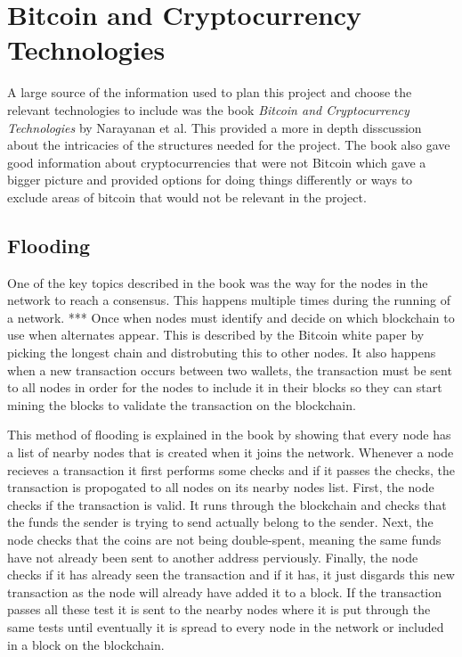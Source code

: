 \documentclass{l4proj}
\begin{document}
\section{Bitcoin and Cryptocurrency Technologies}
A large source of the information used to plan this project and choose the relevant technologies to include was the
book \emph{Bitcoin and Cryptocurrency Technologies} by Narayanan et al. This provided a more in depth disscussion
about the intricacies of the structures needed for the project. The book also gave good information about cryptocurrencies
that were not Bitcoin which gave a bigger picture and provided options for doing things differently or ways to 
exclude areas of bitcoin that would not be relevant in the project.

\subsection{Flooding}
One of the key topics described in the book was the way for the nodes in the network to reach a consensus. This happens
multiple times during the running of a network. *** Once when nodes must identify and decide on which blockchain to use when
alternates appear. This is described by the Bitcoin white paper by picking the longest chain and distrobuting this to 
other nodes. It also happens when a new transaction occurs between two wallets, the transaction must be sent to all
nodes in order for the nodes to include it in their blocks so they can start mining the blocks to validate the transaction 
on the blockchain.

This method of flooding is explained in the book by showing that every node has a list of nearby nodes that is created
when it joins the network. Whenever a node recieves a transaction it first performs some checks and if it passes the 
checks, the transaction is propogated to all nodes on its nearby nodes list. First, the node checks if the transaction is
valid. It runs through the blockchain and checks that the funds the sender is trying to send actually belong to the sender.
Next, the node checks that the coins are not being double-spent, meaning the same funds have not already been sent to another
address perviously. Finally, the node checks if it has already seen the transaction and if it has, it just disgards this new
transaction as the node will already have added it to a block. If the transaction passes all these test it is sent to the
nearby nodes where it is put through the same tests until eventually it is spread to every node in the network or included
in a block on the blockchain.
\end{document}
